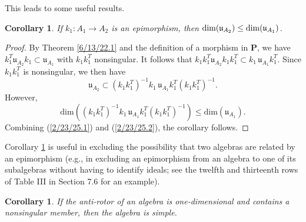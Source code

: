 \documentclass{amsart}
\newtheorem{corollary}[theorem]{Corollary}
\theoremstyle{definition}
\numberwithin{theorem}{section}
\numberwithin{equation}{section}
\begin{document}
This leads to some useful results.  

\begin{corollary} \label{8/17/22.5} If $k_1:A_1\rightarrow A_2$ is an epimorphism, then ${\rm dim}(\mathfrak{u}_{A_2}) \le {\rm dim}(\mathfrak{u}_{A_1})$. \end{corollary}  

\begin{proof} By Theorem \ref{6/13/22.1} and the definition of a morphism in $\mathbf{P}$, we have \mbox{$k_1^T \mathfrak{u}_{A_2} k_1 \subset \mathfrak{u}_{A_1}$} with $k_1k_1^T$ nonsingular.  It follows that  $k_1k_1^T \mathfrak{u}_{A_2} k_1k_1^T \subset k_1\,\mathfrak{u}_{A_1}k_1^T$.  Since $k_1k_1^T$ is nonsingular, we then have 
\begin{equation}\label{2/23/25.1} \mathfrak{u}_{A_2} \subset (k_1k_1^T)^{-1}k_1\, \mathfrak{u}_{A_1} k_1^T(k_1k_1^T)^{-1}.\end{equation}  However, \begin{equation}\label{2/23/25.2}  \text{dim}\left((k_1k_1^T)^{-1}k_1 \,\mathfrak{u}_{A_1} k_1^T(k_1k_1^T)^{-1}\right) \le \text{dim}(\mathfrak{u}_{A_1}).\end{equation} Combining (\ref{2/23/25.1}) and (\ref{2/23/25.2}), the corollary follows.
   \end{proof}
   
  Corollary \ref{8/17/22.5} is useful in excluding the possibility that two algebras are related by an epimorphism (e.g., in excluding an epimorphism from an algebra to one of its subalgebras without having to identify ideals; see the twelfth and thirteenth rows of Table III in Section 7.6 for an example).


\begin{corollary}\label{8/17/22.1} If the anti-rotor of an algebra is one-dimensional and contains a nonsingular member, then the algebra is simple. \end{corollary}
\end{document}
